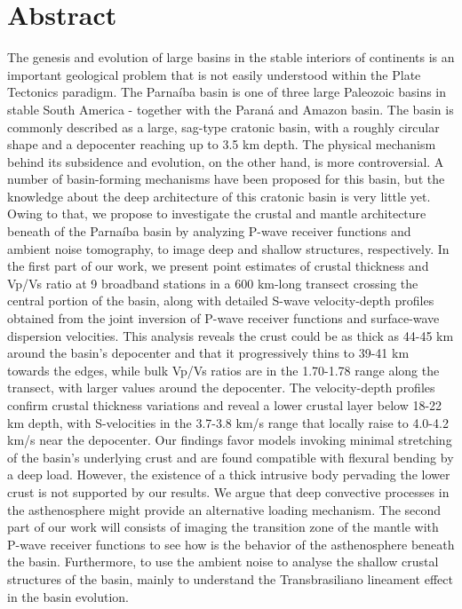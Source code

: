 \chapter*{Abstract}
The genesis and evolution of large basins in the stable interiors of continents is an important geological problem that is not easily understood within the Plate Tectonics paradigm. The Parnaíba basin is one of three large Paleozoic basins in stable South America - together with the Paraná and Amazon basin. The basin is commonly described as a large, sag-type cratonic basin, with a roughly circular shape and a depocenter reaching up to 3.5 km depth. The physical mechanism behind its subsidence and evolution, on the other hand, is more controversial. A number of basin-forming mechanisms have been proposed for this basin, but the knowledge about the deep architecture of this cratonic basin is very little yet. Owing to that, we propose to investigate the crustal and mantle architecture beneath of the Parnaíba basin by analyzing P-wave receiver functions and ambient noise tomography, to image deep and shallow structures, respectively. In the first part of our work, we present point estimates of crustal thickness and Vp/Vs ratio at 9 broadband stations in a 600 km-long transect crossing the central portion of the basin, along with detailed S-wave velocity-depth profiles obtained from the joint inversion of P-wave receiver functions and surface-wave dispersion velocities. This analysis reveals the crust could be as thick as 44-45 km around the basin’s depocenter and that it progressively thins to 39-41 km towards the edges, while bulk Vp/Vs ratios are in the 1.70-1.78 range along the transect, with larger values around the depocenter. The velocity-depth profiles confirm crustal thickness variations and reveal a lower crustal layer below 18-22 km depth, with S-velocities in the 3.7-3.8 km/s range that locally raise to 4.0-4.2 km/s near the depocenter. Our findings favor models invoking minimal stretching of the basin’s underlying crust and are found compatible with flexural bending by a deep load. However, the existence of a thick intrusive body pervading the lower crust is not supported by our results. We argue that deep convective processes in the asthenosphere might provide an alternative loading mechanism. The second part of our work will consists of imaging the transition zone of the mantle with P-wave receiver functions to see how is the behavior of the asthenosphere beneath the basin. Furthermore, to use the ambient noise to analyse the shallow crustal structures of the basin, mainly to understand the Transbrasiliano lineament effect in the basin evolution.

